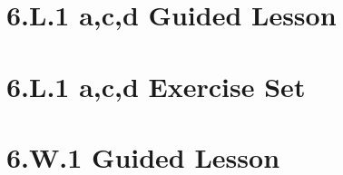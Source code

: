 \documentclass[a4paper,12pt]{article}
\begin{document}
% 

\newpage
\section{6.L.1 a,c,d Guided Lesson}

\newpage



\newpage
\section{6.L.1 a,c,d Exercise Set}

\newpage

\newpage


\newpage
\section{6.W.1 Guided Lesson}


% 
\end{document}
